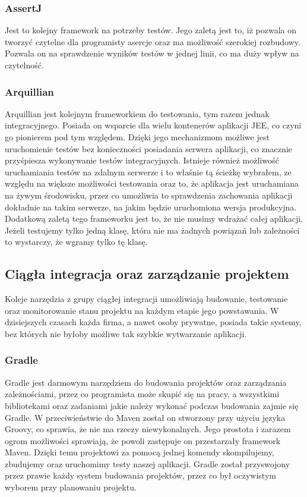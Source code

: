 \subsubsection{AssertJ}
Jest to kolejny framework na potrzeby testów. Jego zaletą jest to, iż pozwala on tworzyć czytelne dla programisty asercje oraz ma możliwość szerokiej rozbudowy. Pozwala on na sprawdzenie wyników testów w jednej linii, co ma duży wpływ na czytelność.

\subsubsection{Arquillian}
Arquillian jest kolejnym frameworkiem do testowania, tym razem jednak integracyjnego. Posiada on wsparcie dla wielu kontenerów aplikacji JEE, co czyni go pionierem pod tym względem. Dzięki jego mechanizmom możliwe jest uruchomienie testów bez konieczności posiadania serwera aplikacji, co znacznie przyśpiesza wykonywanie testów integracyjnych. Istnieje również możliwość uruchamiania testów na zdalnym serwerze i to właśnie tą ścieżkę wybrałem, ze względu na większe możliwości testowania oraz to, że aplikacja jest uruchamiana na żywym środowisku, przez co umożliwia to sprawdzenia zachowania aplikacji dokładnie na takim serwerze, na jakim będzie uruchomiona wersja produkcyjna. Dodatkową zaletą tego frameworku jest to, że nie musimy wdrażać całej aplikacji. Jeżeli testujemy tylko jedną klasę, która nie ma żadnych powiązań lub zależności to wystarczy, że wgramy tylko tę klasę.

\subsection{Ciągła integracja oraz zarządzanie projektem}
Koleje narzędzia z grupy ciągłej integracji umożliwiają budowanie, testowanie oraz monitorowanie stanu projektu na każdym etapie jego powstawania. W dzisiejszych czasach każda firma, a nawet osoby prywatne, posiada takie systemy, bez których nie byłoby możliwe tak szybkie wytwarzanie aplikacji.

\subsubsection{Gradle}
Gradle jest darmowym narzędziem do budowania projektów oraz zarządzania zależnościami, przez co programista może skupić się na pracy, a wszystkimi bibliotekami oraz zadaniami jakie należy wykonać podczas budowania zajmie się Gradle. W przeciwieństwie do Maven został on stworzony przy użyciu języka Groovy, co sprawia, że nie ma rzeczy niewykonalnych. Jego prostota i zarazem ogrom możliwości sprawiają, że powoli zastępuje on przestarzały framework Maven. Dzięki temu projektowi za pomocą jednej komendy skompilujemy, zbudujemy oraz uruchomimy testy naszej aplikacji. Gradle został przyswojony przez prawie każdy system budowania projektów, przez co był oczywistym wyborem przy planowaniu projektu.

